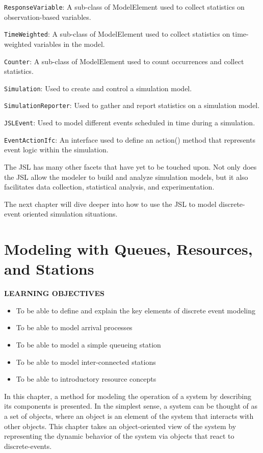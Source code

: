 \documentclass[
]{book}
\theoremstyle{definition}
\theoremstyle{definition}
\theoremstyle{definition}
\theoremstyle{definition}
\theoremstyle{remark}
\begin{document}
\texttt{ResponseVariable}: A sub-class of ModelElement used to collect statistics on
observation-based variables.

\texttt{TimeWeighted}: A sub-class of ModelElement used to collect statistics on
time-weighted variables in the model.

\texttt{Counter}: A sub-class of ModelElement used to count occurrences and collect
statistics.

\texttt{Simulation}: Used to create and control a simulation model.

\texttt{SimulationReporter}: Used to gather and report statistics on a simulation model.

\texttt{JSLEvent}: Used to model different events scheduled in time during a
simulation.

\texttt{EventActionIfc}: An interface used to define an action() method that represents event
logic within the simulation.

The JSL has many other facets that have yet to be touched upon. Not only
does the JSL allow the modeler to build and analyze simulation models,
but it also facilitates data collection, statistical analysis, and
experimentation.

The next chapter will dive deeper into how to use the JSL to model
discrete-event oriented simulation situations.

\hypertarget{dem}{%
\chapter{Modeling with Queues, Resources, and Stations}\label{dem}}

\textbf{\textsc{LEARNING OBJECTIVES}}

\begin{itemize}
\item
  To be able to define and explain the key elements of discrete event modeling
\item
  To be able to model arrival processes
\item
  To be able to model a simple queueing station
\item
  To be able to model inter-connected stations
\item
  To be able to introductory resource concepts
\end{itemize}

In this chapter, a method for modeling the
operation of a system by describing its components is presented. In the
simplest sense, a system can be thought of as a set of objects, where an
object is an element of the system that interacts with other objects.
This chapter takes an object-oriented view of the system by representing
the dynamic behavior of the system via objects that react to discrete-events.
\end{document}
